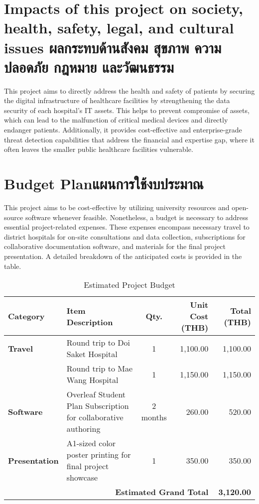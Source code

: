 \section{\ifenglish%
Impacts of this project on society, health, safety, legal, and cultural issues
\else%
ผลกระทบด้านสังคม สุขภาพ ความปลอดภัย กฎหมาย และวัฒนธรรม
\fi}

This project aims to directly address the health and safety of patients by securing the digital infrastructure of healthcare facilities by strengthening the data security of each hospital's IT assets. This helps to prevent compromise of assets, which can lead to the malfunction of critical medical devices and directly endanger patients. Additionally, it provides cost-effective and enterprise-grade threat detection capabilities that address the financial and expertise gap, where it often leaves the smaller public healthcare facilities vulnerable.

\section{\ifenglish Budget Plan\else แผนการใช้งบประมาณ\fi}
This project aims to be cost-effective by utilizing university resources and open-source software whenever feasible. Nonetheless, a budget is necessary to address essential project-related expenses. These expenses encompass necessary travel to district hospitals for on-site consultations and data collection, subscriptions for collaborative documentation software, and materials for the final project presentation. A detailed breakdown of the anticipated costs is provided in the table.

\begin{table}[h!]
\centering
\caption{Estimated Project Budget}
\label{tab:budget}
\begin{tabularx}{\linewidth}{@{} l >{\raggedright\arraybackslash}X c r r @{}}
\toprule
\textbf{Category} & \textbf{Item Description} & \textbf{Qty.} & \textbf{Unit Cost (THB)} & \textbf{Total (THB)} \\ \midrule
\textbf{Travel} & Round trip to Doi Saket Hospital & 1 & 1,100.00 & 1,100.00 \\
 & Round trip to Mae Wang Hospital & 1 & 1,150.00 & 1,150.00 \\ \addlinespace
\textbf{Software} & Overleaf Student Plan Subscription for collaborative authoring & 2 months & 260.00 & 520.00 \\ \addlinespace
\textbf{Presentation} & A1-sized color poster printing for final project showcase & 1 & 350.00 & 350.00 \\ \midrule[\heavyrulewidth]
\multicolumn{4}{r}{\textbf{Estimated Grand Total}} & \textbf{3,120.00} \\ \bottomrule
\end{tabularx}
\end{table}